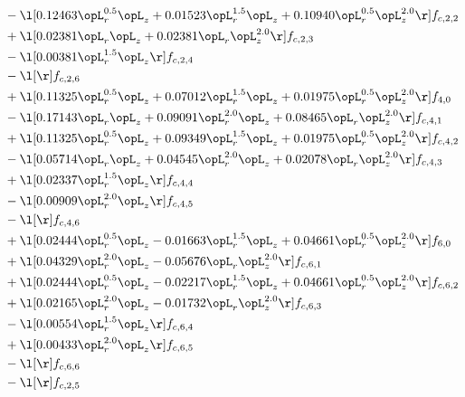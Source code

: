 \begin{alignat}{2}
& - \l[  0.12463 \opL_r^{0.5} \opL_z +  0.01523 \opL_r^{1.5} \opL_z +  0.10940 \opL_r^{0.5} \opL_z^{2.0}  \r] f_{c,2,2} \nonumber \\ 
& + \l[  0.02381 \opL_r \opL_z +  0.02381 \opL_r \opL_z^{2.0}  \r] f_{c,2,3} \nonumber \\ 
& - \l[  0.00381 \opL_r^{1.5} \opL_z  \r] f_{c,2,4} \nonumber \\ 
& - \l[  \r] f_{c,2,6} \nonumber \\ 
& + \l[  0.11325 \opL_r^{0.5} \opL_z +  0.07012 \opL_r^{1.5} \opL_z +  0.01975 \opL_r^{0.5} \opL_z^{2.0}  \r] f_{4,0} \nonumber \\ 
& - \l[  0.17143 \opL_r \opL_z +  0.09091 \opL_r^{2.0} \opL_z +  0.08465 \opL_r \opL_z^{2.0}  \r] f_{c,4,1} \nonumber \\ 
& + \l[  0.11325 \opL_r^{0.5} \opL_z +  0.09349 \opL_r^{1.5} \opL_z +  0.01975 \opL_r^{0.5} \opL_z^{2.0}  \r] f_{c,4,2} \nonumber \\ 
& - \l[  0.05714 \opL_r \opL_z +  0.04545 \opL_r^{2.0} \opL_z +  0.02078 \opL_r \opL_z^{2.0}  \r] f_{c,4,3} \nonumber \\ 
& + \l[  0.02337 \opL_r^{1.5} \opL_z  \r] f_{c,4,4} \nonumber \\ 
& - \l[  0.00909 \opL_r^{2.0} \opL_z  \r] f_{c,4,5} \nonumber \\ 
& - \l[  \r] f_{c,4,6} \nonumber \\ 
& + \l[  0.02444 \opL_r^{0.5} \opL_z   -0.01663 \opL_r^{1.5} \opL_z +  0.04661 \opL_r^{0.5} \opL_z^{2.0}  \r] f_{6,0} \nonumber \\ 
& + \l[  0.04329 \opL_r^{2.0} \opL_z   -0.05676 \opL_r \opL_z^{2.0}  \r] f_{c,6,1} \nonumber \\ 
& + \l[  0.02444 \opL_r^{0.5} \opL_z   -0.02217 \opL_r^{1.5} \opL_z +  0.04661 \opL_r^{0.5} \opL_z^{2.0}  \r] f_{c,6,2} \nonumber \\ 
& + \l[  0.02165 \opL_r^{2.0} \opL_z   -0.01732 \opL_r \opL_z^{2.0}  \r] f_{c,6,3} \nonumber \\ 
& - \l[  0.00554 \opL_r^{1.5} \opL_z  \r] f_{c,6,4} \nonumber \\ 
& + \l[  0.00433 \opL_r^{2.0} \opL_z  \r] f_{c,6,5} \nonumber \\ 
& - \l[  \r] f_{c,6,6} \nonumber \\ 
& - \l[  \r] f_{c,2,5} \nonumber \\ 
\end{alignat} 



